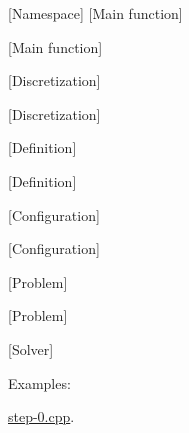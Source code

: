 \mbox{[}Namespace\mbox{]} \mbox{[}Main function\mbox{]} 

\mbox{[}Main function\mbox{]}

\mbox{[}Discretization\mbox{]}

\mbox{[}Discretization\mbox{]}

\mbox{[}Definition\mbox{]}

\mbox{[}Definition\mbox{]}

\mbox{[}Configuration\mbox{]}

\mbox{[}Configuration\mbox{]}

\mbox{[}Problem\mbox{]}

\mbox{[}Problem\mbox{]}

\mbox{[}Solver\mbox{]} \begin{Desc}
\item[Examples: ]\par
\hyperlink{step-0_8cpp-example}{step-\/0.cpp}.\end{Desc}
